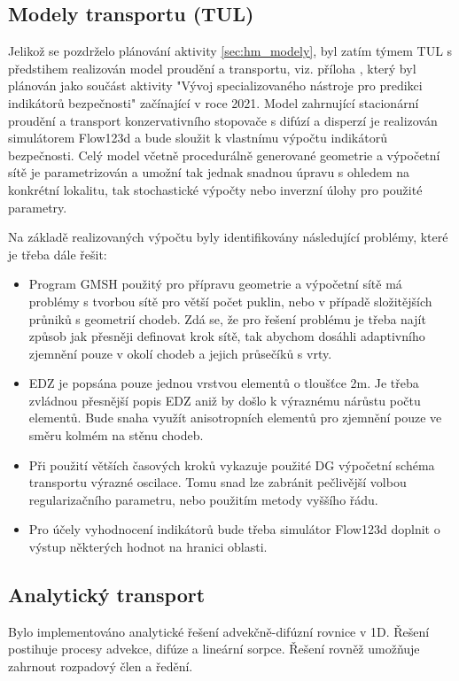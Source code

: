 \documentclass[11pt,a4paper]{article}
\begin{document}
\begin{onehalfspacing}
\section{Modely transportu (TUL)}
\label{sec:transport}

Jelikož se pozdrželo plánování aktivity \ref{sec:hm_modely}, byl zatím týmem TUL s předstihem realizován model proudění a transportu, 
viz. příloha , který byl plánován jako součást aktivity "Vývoj specializovaného nástroje pro predikci indikátorů bezpečnosti" začínající v roce 2021. Model zahrnující stacionární proudění a transport konzervativního stopovače s difúzí a disperzí je realizován simulátorem Flow123d a bude sloužit k vlastnímu výpočtu indikátorů bezpečnosti. Celý model včetně procedurálně generované geometrie a výpočetní sítě je parametrizován a umožní tak jednak snadnou úpravu s ohledem na konkrétní 
lokalitu, tak stochastické výpočty nebo inverzní úlohy pro použité parametry.

Na základě realizovaných výpočtu byly identifikovány následující problémy, které je třeba dále řešit:
\begin{itemize}
    \item Program GMSH použitý pro přípravu geometrie a výpočetní sítě má problémy s tvorbou sítě pro větší počet puklin, nebo v případě složitějších průniků s geometrií chodeb. Zdá se, že pro řešení problému je třeba najít způsob jak přesněji definovat 
    krok sítě, tak abychom dosáhli adaptivního zjemnění pouze v okolí chodeb a jejich průsečíků s vrty.
    \item EDZ je popsána pouze jednou vrstvou elementů o tloušťce 2m. Je třeba zvládnou přesnější popis EDZ aniž by došlo k výraznému nárůstu počtu elementů. Bude snaha využít anisotropních elementů pro zjemnění pouze ve směru kolmém na stěnu chodeb.
    \item Při použití větších časových kroků vykazuje použité DG výpočetní schéma transportu výrazné oscilace. Tomu snad lze zabránit
    pečlivější volbou regularizačního parametru, nebo použitím metody vyššího řádu.
    \item Pro účely vyhodnocení indikátorů bude třeba simulátor Flow123d doplnit o výstup některých hodnot na hranici oblasti.
\end{itemize}

\subsection{Analytický transport}
Bylo implementováno analytické řešení advekčně-difúzní rovnice v 1D.  
Řešení postihuje procesy advekce, difúze a lineární sorpce. Řešení rovněž umožňuje zahrnout rozpadový člen a ředění.


\end{onehalfspacing}
\end{document}

